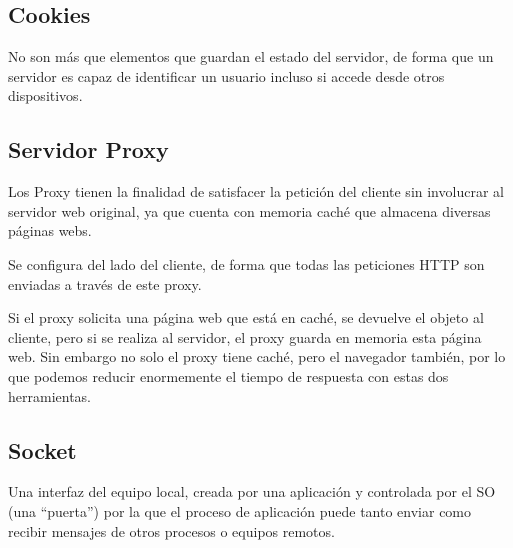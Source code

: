\subsection{Cookies}
\noindent No son más que elementos que guardan el estado del servidor, de forma que un servidor es capaz de identificar un usuario incluso si accede desde otros dispositivos.
\subsection{Servidor Proxy}
\noindent Los Proxy tienen la finalidad de satisfacer la petición del cliente sin involucrar al servidor web original, ya que cuenta con memoria caché que almacena diversas páginas webs.
\par \noindent Se configura del lado del cliente, de forma que todas las peticiones HTTP son enviadas a través de este proxy.
\par \noindent Si el proxy solicita una página web que está en caché, se devuelve el objeto al cliente, pero si se realiza al servidor, el proxy guarda en memoria esta página web. Sin embargo no solo el proxy tiene caché, pero el navegador también, por lo que podemos reducir enormemente el tiempo de respuesta con estas dos herramientas.
\subsection{Socket}
\noindent Una interfaz del equipo local, creada por una aplicación y controlada por el SO (una “puerta”) por la que el proceso de aplicación puede tanto enviar como recibir mensajes de otros procesos o equipos remotos.